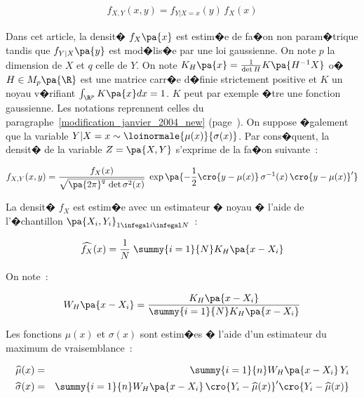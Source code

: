        \begin{eqnarray}
        f_{X,Y}(x,y) = f_{Y | X=x}(y) \, f_X(x)
        \end{eqnarray}

Dans cet article, la densit� $f_X\pa{x}$ est estim�e de fa�on non param�trique tandis que $f_{Y|X}\pa{y}$ est mod�lis�e par une loi gaussienne. On note $p$ la dimension de $X$ et $q$ celle de $Y$. On note $K_H \pa{x} = \frac{1}{\det H} K \pa{H^{-1} X}$ o� $H \in M_p\pa{\R}$ est une matrice carr�e d�finie strictement positive et $K$ un noyau v�rifiant $\int_{\R^p} K\pa{x} dx = 1$. $K$ peut par exemple �tre une fonction gaussienne. Les notations reprennent celles du paragraphe~\ref{modification_janvier_2004_new} (page~\pageref{modification_janvier_2004_new}). On suppose �galement que la variable $Y | X=x \sim \loinormale{\mu(x)}{\sigma(x)}$. Par cons�quent, la densit� de la variable $Z =\pa{X,Y}$ s'exprime de la fa�on suivante~:


        \begin{eqnarray}
        f_{X,Y}(x,y) =  \frac{ f_X(x) } { \sqrt{ \pa{2 \pi}^q \, \det \sigma^2(x) } } \;
                                        \exp \pa{ - \frac{1}{2} \cro{y - \mu(x)} \, \sigma^{-1}(x) \, \cro{y - \mu(x)}' }
        \end{eqnarray}


La densit� $f_X$ est estim�e avec un estimateur � noyau � l'aide de l'�chantillon $\pa{X_i,Y_i}_{1 \infegal i \infegal N}$~:

        
        \begin{eqnarray}
        \widehat{f_X} (x) = \frac{1}{N} \; \summy{i=1}{N} K_{H} \pa{ x - X_i}
        \end{eqnarray}

On note~:

        \begin{eqnarray}
        W_H\pa{x - X_i} =  \frac{K_H\pa{x - X_i}} {\summy{i=1}{N} K_H\pa{x - X_i} }
        \end{eqnarray}
        
Les fonctions $\mu(x)$ et $\sigma(x)$ sont estim�es � l'aide d'un estimateur du maximum de vraisemblance~:
        
        \begin{eqnarray}
        \widehat{\mu}(x)         &=& \summy{i=1}{n} W_H\pa{x - X_i} \, Y_i \\
        \widehat{\sigma}(x) &=& \summy{i=1}{n} W_H\pa{x - X_i} \, 
                                                        \cro{Y_i - \widehat{\mu}(x)}' \cro{Y_i - \widehat{\mu}(x)} 
        \end{eqnarray}

